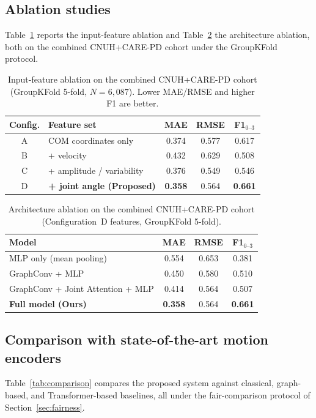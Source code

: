 \documentclass[preprint,12pt]{elsarticle}
\begin{document}
\subsection{Ablation studies}
\label{sec:ablation}
Table~\ref{tab:ablation_feat} reports the input-feature ablation and
Table~\ref{tab:ablation_arch} the architecture ablation, both on the combined CNUH+CARE-PD cohort under the GroupKFold protocol.

\begin{table}[htpb]
\centering
\caption{Input-feature ablation on the combined CNUH+CARE-PD cohort
(GroupKFold 5-fold, $N=6{,}087$).
Lower MAE/RMSE and higher F1 are better.}
\label{tab:ablation_feat}
\begin{tabular}{clccc}
\toprule
\textbf{Config.} & \textbf{Feature set} & \textbf{MAE} & \textbf{RMSE} &
\textbf{F1$_{0\text{--}3}$} \\
\midrule
A & COM coordinates only            & 0.374 & 0.577 & 0.617 \\
B & + velocity                      & 0.432 & 0.629 & 0.508 \\
C & + amplitude / variability       & 0.376 & 0.549 & 0.546 \\
D & \textbf{+ joint angle (Proposed)} & \textbf{0.358} & 0.564 & \textbf{0.661} \\
\bottomrule
\end{tabular}
\end{table}

\begin{table}[htpb]
\centering
\caption{Architecture ablation on the combined CNUH+CARE-PD cohort
(Configuration~D features, GroupKFold 5-fold).}
\label{tab:ablation_arch}
\begin{tabular}{lccc}
\toprule
\textbf{Model} & \textbf{MAE} & \textbf{RMSE} & \textbf{F1$_{0\text{--}3}$} \\
\midrule
MLP only (mean pooling)            & 0.554 & 0.653 & 0.381 \\
GraphConv + MLP                    & 0.450 & 0.580 & 0.510 \\
GraphConv + Joint Attention + MLP  & 0.414 & 0.564 & 0.507 \\
\textbf{Full model (Ours)}         & \textbf{0.358} & 0.564 & \textbf{0.661} \\
\bottomrule
\end{tabular}
\end{table}

\subsection{Comparison with state-of-the-art motion encoders}
\label{sec:comparison}
Table~\ref{tab:comparison} compares the proposed system against classical,
graph-based, and Transformer-based baselines, all under the fair-comparison
protocol of Section~\ref{sec:fairness}.
\end{document}
